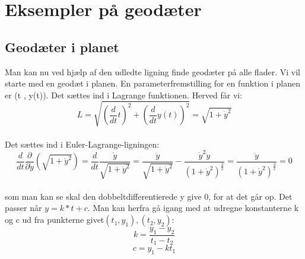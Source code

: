 
\section{Eksempler på geodæter}
\subsection{Geodæter i planet}
Man kan nu ved hjælp af den udledte ligning finde geodæter på alle flader. Vi vil starte med en geodæt i planen. En parameterfremstilling for en funktion i planen er (t , y(t)). Det sættes ind i Lagrange funktionen. Herved får vi: \\
$$L=\sqrt{(\frac{d}{dt}t)^2+(\frac{d}{dt}y(t))^2}=\sqrt{1+\dot{y}^2}$$ \\
Det sættes ind i Euler-Lagrange-ligningen: \\
$$\frac{d}{dt} \frac{\partial}{\partial \dot{y}}(\sqrt{1+\dot{y}^2})=\frac{d}{dt} \frac{\dot{y}}{\sqrt{1+\dot{y}^2}} = \frac{\ddot{y}}{\sqrt{1+\dot{y}^2}}-\frac{\dot{y}^2\ddot{y}}{(1+\dot{y}^2)^\frac{3}{2}}=\frac{\ddot{y}}{(1+\dot{y}^2)^\frac{3}{2}}=0$$ \\
som man kan se skal den dobbeltdifferentierede y give 0, for at det går op. Det passer når $y=k*t+c$. Man kan herfra gå igang med at udregne konstanterne k og c ud fra punkterne givet$(t_{1},y_{1}),(t_{2},y_{2})$: \\
$$k=\frac{y_{1}-y_{2}}{t_{1}-t_{2}}$$
$$c=y_{1}-kt_{1}$$

